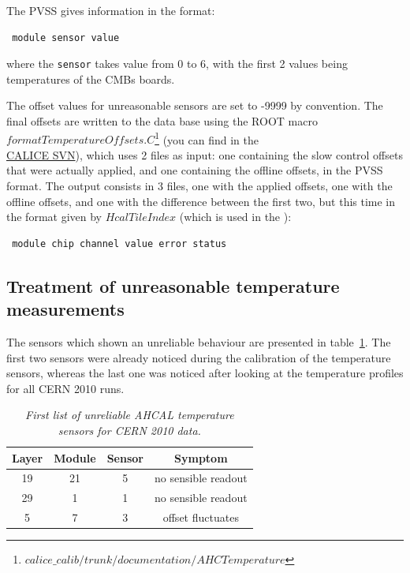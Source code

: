 \documentclass[a4paper,10pt]{article}
\begin{document}
The PVSS gives information in the format:
\begin{verbatim}
 module sensor value
\end{verbatim}
where the \verb!sensor! takes value from 0 to 6, with the first 2 values being temperatures of the CMBs boards.

The offset values for unreasonable sensors are set to -9999 by convention. 
The final offsets are written to the data base using the ROOT macro $formatTemperatureOffsets.C$\footnote{$calice\_calib/trunk/documentation/AHCTemperature$} (you can find in the\\ 
\href{https://svnsrv.desy.de/websvn/wsvn/General.calice/calice_calib/trunk/documentation/AHCTemperature/formatTemperatureOffsets.C}{CALICE SVN}), which uses 2 files as input: one containing the slow control offsets that were actually applied, and one containing the offline offsets, in the PVSS format. The output consists in 3 files, one with the applied offsets, one with the offline offsets, and one with the difference between the first two, but this time in the format given by $HcalTileIndex$ (which is used in the ):
\begin{verbatim}
 module chip channel value error status
\end{verbatim}

\subsection{Treatment of unreasonable temperature measurements}

The sensors which shown an unreliable behaviour  are presented in table~\ref{tab:firstBadSensors}. The first two sensors were already noticed during
the calibration of the temperature sensors, whereas the last one was noticed after looking at the temperature profiles for all CERN 2010 runs.

\begin{table}[h]
\begin{center}
\begin{tabular}{|c|c|c|c|}
\hline
 \textbf{Layer}& \textbf{Module} & \textbf{Sensor} &\textbf{Symptom} \\ \hline\hline
19 & 21 & 5 & no sensible readout\\ 
29 & 1 & 1 & no sensible readout\\\hline
5  & 7 & 3 & offset fluctuates\\\hline
\end{tabular}
\end{center}

\caption{\textsl{First list of unreliable AHCAL temperature sensors for CERN 2010 data.}}
\label{tab:firstBadSensors}
\end{table}
\end{document}
